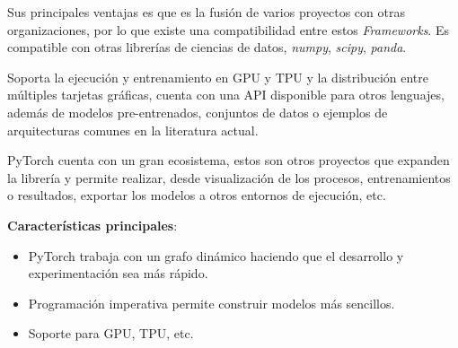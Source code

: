 Sus principales ventajas es que es la fusión de varios proyectos con otras organizaciones, por lo que existe una compatibilidad entre estos \textit{Frameworks}. Es compatible con otras librerías de ciencias de datos, \textit{numpy}, \textit{scipy}, \textit{panda}.

Soporta la ejecución y entrenamiento en \gls{GPU} y \gls{TPU} y la distribución entre múltiples tarjetas gráficas, cuenta con una \gls{API} disponible para otros lenguajes, además de modelos pre-entrenados, conjuntos de datos o ejemplos de arquitecturas comunes en la literatura actual.

PyTorch cuenta con un gran ecosistema, estos son otros proyectos que expanden la librería y permite realizar, desde visualización de los procesos, entrenamientos o resultados, exportar los modelos a otros entornos de ejecución, etc.

\textbf{Características principales}:
\begin{itemize}
    \item PyTorch trabaja con un grafo dinámico haciendo que el desarrollo y experimentación sea más rápido.
    \item Programación imperativa permite construir modelos más sencillos.
    \item Soporte para \gls{GPU}, \gls{TPU}, etc.
\end{itemize}


